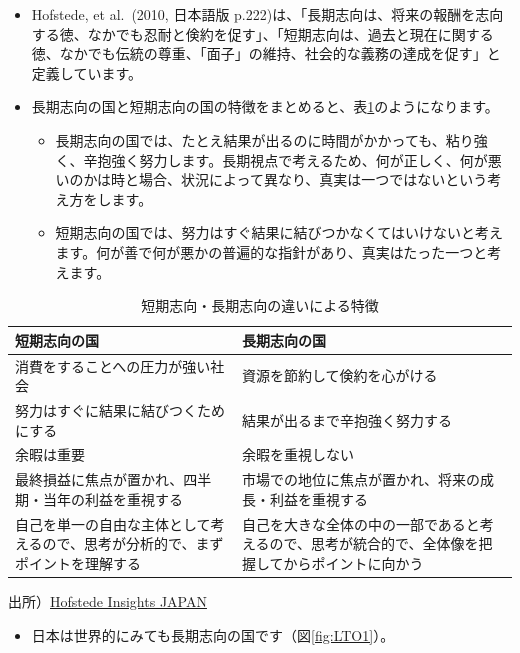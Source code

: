\documentclass[
]{book}
\providecommand{\tightlist}{%
  \setlength{\itemsep}{0pt}\setlength{\parskip}{0pt}}
\begin{document}
\begin{itemize}
\item
  Hofstede, et al.~(2010, 日本語版 p.222)は、「長期志向は、将来の報酬を志向する徳、なかでも忍耐と倹約を促す」、「短期志向は、過去と現在に関する徳、なかでも伝統の尊重、「面子」の維持、社会的な義務の達成を促す」と定義しています。
\item
  長期志向の国と短期志向の国の特徴をまとめると、表\ref{tab:LTO0}のようになります。

  \begin{itemize}
  \item
    長期志向の国では、たとえ結果が出るのに時間がかかっても、粘り強く、辛抱強く努力します。長期視点で考えるため、何が正しく、何が悪いのかは時と場合、状況によって異なり、真実は一つではないという考え方をします。
  \item
    短期志向の国では、努力はすぐ結果に結びつかなくてはいけないと考えます。何が善で何が悪かの普遍的な指針があり、真実はたった一つと考えます。
  \end{itemize}
\end{itemize}

\begin{table}

\caption{\label{tab:LTO0}短期志向・長期志向の違いによる特徴}
\centering
\begin{tabular}[t]{l|l}
\hline
短期志向の国 & 長期志向の国\\
\hline
消費をすることへの圧力が強い社会 & 資源を節約して倹約を心がける\\
\hline
努力はすぐに結果に結びつくためにする & 結果が出るまで辛抱強く努力する\\
\hline
余暇は重要 & 余暇を重視しない\\
\hline
最終損益に焦点が置かれ、四半期・当年の利益を重視する & 市場での地位に焦点が置かれ、将来の成長・利益を重視する\\
\hline
自己を単一の自由な主体として考えるので、思考が分析的で、まずポイントを理解する & 自己を大きな全体の中の一部であると考えるので、思考が統合的で、全体像を把握してからポイントに向かう\\
\hline
\end{tabular}
\end{table}

出所）\href{https://hofstede.jp/6dimentionsmodel_lto/}{Hofstede Insights JAPAN}

\begin{itemize}
\tightlist
\item
  日本は世界的にみても長期志向の国です（図\ref{fig:LTO1}）。
\end{itemize}
\end{document}
